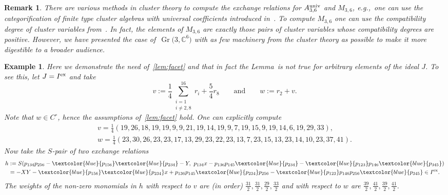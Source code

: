 \documentclass[10pt,a4paper]{amsart}
\newcommand{\thlabel}[1]{\label{#1}}
\newcommand{\thref}[1]{\ref{#1}}
\newtheorem{Example}[Theorem]{Example}
\newtheorem{Remark}[Theorem]{Remark}}
\numberwithin{equation}{section}
\DeclareMathOperator{\Gr}{Gr}
\begin{document}
\begin{Remark}\thlabel{rmk:cluster techniques}
There are various methods in cluster theory to compute the exchange relations for $A_{3,6}^{\rm univ}$ and $M_{3,6} $, e.g.,~one can use the categorification of finite type cluster algebras with universal coefficients introduced in~\cite{NC_univ}.
To compute $M_{3,6} $ one can use the compatibility degree of cluster variables from~\cite{FZ_Y-systems}.
In fact, the elements of $M_{3,6}$ are exactly those pairs of cluster variables whose compatibility degrees are positive.
However, we have presented the case of~$\Gr\big(3,\mathbb C^6\big)$ with as few machinery from the cluster theory as possible to make it more digestible to a broader audience.
\end{Remark}
\begin{Example}\thlabel{exp:lem facet}
Here we demonstrate the need of~\thref{lem:facet} and that in fact the Lemma~is not true for arbitrary elements of the ideal $J$. To see this, let $J=I^{\rm ex}$ and take
\begin{displaymath}
v:= \frac{1}{4}\sum_{\begin{smallmatrix}
i=1\\
i\not =2,8
\end{smallmatrix}}^{16} r_i + \frac{5}{4}r_8\qquad \text{and}\qquad w := r_2 + v.
\end{displaymath}
Note that $w\in C^\circ$, hence the assumptions of~\thref{lem:facet} hold.
One can explicitly compute
\begin{gather*}
v = \frac{1}{4}(19, 26, 18, 19, 19, 9, 9, 21, 19, 14, 19, 9, 7, 19, 15, 9, 19, 14, 6, 19, 29, 33),
\\
w = \frac{1}{4}(23, 30, 26, 23, 23, 17, 13, 29, 23, 22, 23, 13, 7, 23, 15, 13, 23, 14, 10, 23, 37, 41).
\end{gather*}
Now take the $S$-pair of two exchange relations
\begin{displaymath}\begin{split}
h&:=S(p_{134}p_{256} - \textcolor{blue}{p_{156}}\textcolor{blue}{p_{234}} - {Y},\ p_{134}x - p_{136}p_{145}\textcolor{blue}{p_{234}} - \textcolor{blue}{p_{123}}p_{146}\textcolor{blue}{p_{345}}) \\
&= -{XY} - \textcolor{blue}{p_{156}}\textcolor{blue}{p_{234}}x + p_{136}p_{145}\textcolor{blue}{p_{234}}p_{256} - \textcolor{blue}{p_{123}}p_{146}p_{256}\textcolor{blue}{p_{345}} \in I^{\rm ex}.\end{split}
\end{displaymath}
The weights of the non-zero monomials in $h$ with respect to $v$ are (in order) $\frac{31}{2} , \frac{31}{2}, \frac{29}{2}, \frac{33}{2}$ and with respect to $w$ are $\frac{39}{2} , \frac{41}{2}, \frac{39}{2}, \frac{41}{2}$.

\end{Example}
\end{document}
